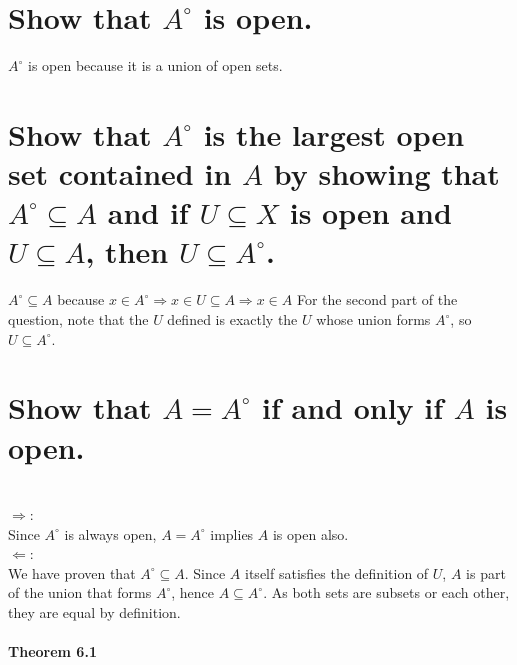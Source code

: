 
\begin{parts}
 \part{Show that $A^\circ$ is open.}
 
\begin{solution}
 $A^\circ$ is open because it is a union of open sets.
\end{solution}

\part{Show that $A^\circ$ is the largest open set contained in $A$ by showing that $A^\circ \subseteq A$ and if $U \subseteq X$ is open and $U \subseteq A$, then $U \subseteq A^\circ$.}

\begin{solution}
 $A^\circ \subseteq A$ because $x \in A^\circ \Rightarrow x \in U \subseteq A \Rightarrow x \in A$ For the second part of the question, note that the $U$ defined is exactly the $U$ whose union forms $A^\circ$, so $U \subseteq A^\circ$. \\
\end{solution}

\part{Show that $A = A^\circ$ if and only if $A$ is open.}

\begin{solution}
 \\$\Rightarrow$: \\
 Since $A^\circ$ is always open, $A = A^\circ$ implies $A$ is open also. \\
 $\Leftarrow$: \\
 We have proven that $A^\circ \subseteq A$. Since $A$ itself satisfies the definition of $U$, $A$ is part of the union that forms $A^\circ$, hence $A \subseteq A^\circ$. As both sets are subsets or each other, they are equal by definition.
\end{solution}
\end{parts}

\subsection{Theorem 6.1}
\setcounter{question}{0}

